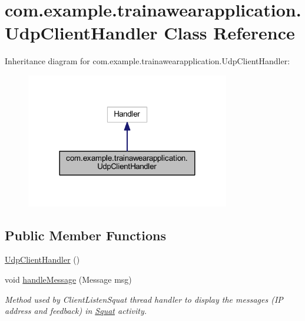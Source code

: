 \hypertarget{classcom_1_1example_1_1trainawearapplication_1_1_udp_client_handler}{}\section{com.\+example.\+trainawearapplication.\+Udp\+Client\+Handler Class Reference}
\label{classcom_1_1example_1_1trainawearapplication_1_1_udp_client_handler}


Inheritance diagram for com.\+example.\+trainawearapplication.\+Udp\+Client\+Handler\+:
\nopagebreak
\begin{figure}[H]
\begin{center}
\leavevmode
\includegraphics[width=252pt]{classcom_1_1example_1_1trainawearapplication_1_1_udp_client_handler__inherit__graph}
\end{center}
\end{figure}
\subsection*{Public Member Functions}
\begin{DoxyCompactItemize}
\item 
\mbox{\hyperlink{classcom_1_1example_1_1trainawearapplication_1_1_udp_client_handler_ab5ff425dbf594d074ab709f2be441419}{Udp\+Client\+Handler}} ()
\item 
void \mbox{\hyperlink{classcom_1_1example_1_1trainawearapplication_1_1_udp_client_handler_a433f624fad2243aaed2e97f7f3cb8434}{handle\+Message}} (Message msg)
\begin{DoxyCompactList}\small\item\em Method used by Client\+Listen\+Squat thread handler to display the messages (IP address and feedback) in \mbox{\hyperlink{classcom_1_1example_1_1trainawearapplication_1_1_squat}{Squat}} activity. \end{DoxyCompactList}\end{DoxyCompactItemize}
